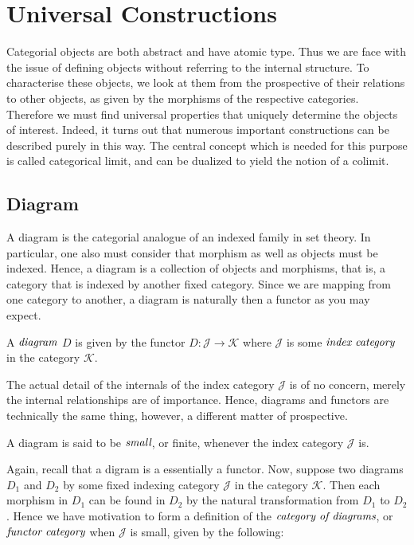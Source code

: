 \documentclass[10pt, oneside, reqno]{amsart}
\begin{document}
\section{Universal Constructions} %
\label{sec:universalconstructions}
Categorial objects are both abstract and have atomic type.
Thus we are face with the issue of defining objects without referring to the internal structure.
To characterise these objects, we look at them from the prospective of their relations to other objects, as given by the morphisms 
of the respective categories. Therefore we must find universal properties that uniquely determine the objects of interest.
Indeed, it turns out that numerous important constructions can be described purely in this way.
The central concept which is needed for this purpose is called categorical limit, and can be dualized to yield the notion of a colimit.

\subsection{Diagram} %
\label{subsec:diagram}
A diagram is the categorial analogue of an indexed family in set theory. In particular, one also must consider that
morphism as well as objects must be indexed. Hence, a diagram is a collection of objects and morphisms, that is,
a category that is indexed by another fixed category. Since we are mapping from one category to another, a diagram is
naturally then a functor as you may expect.
\begin{defn}[Diagram]
 A $\emph{diagram}$ $D$ is given by the functor $D: \mathcal{J} \to \mathcal{K}$
 where $\mathcal{J}$ is some $\emph{index category}$ in the category $\mathcal{K}$.
\end{defn}

The actual detail of the internals of the index category $\mathcal{J}$ is of no concern, merely the internal relationships
are of importance. Hence, diagrams and functors are technically the same thing, however, a different matter of prospective.

\begin{cor}
 A diagram is said to be $\emph{small}$, or finite, whenever the index category $\mathcal{J}$ is.
\end{cor}

Again, recall that a digram is a essentially a functor.
Now, suppose two diagrams $D_{1}$ and $D_{2}$ by some fixed indexing category $\mathcal{J}$ in the category $\mathcal{K}$.
Then each morphism in $D_{1}$ can be found in $D_{2}$ by the natural transformation from $D_{1}$ to $D_{2}$.
Hence we have motivation to form a definition of the $\emph{category of diagrams}$, or $\emph{functor category}$ when
$\mathcal{J}$ is small, given by the following:
\end{document}
